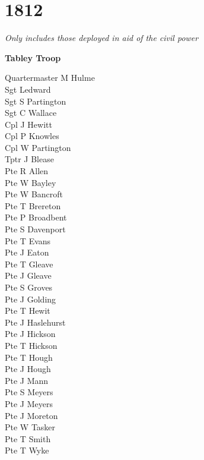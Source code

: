 \chapter*{1812}

\begin{center}
  \textit{Only includes those deployed in aid of the civil power}
\end{center}

\begin{center}
  \Large
  \textbf{Tabley Troop}
\end{center}

\begin{multicols}{2}
  \noindent
  Quartermaster M Hulme \\
  Sgt Ledward \\
  Sgt S Partington \\
  Sgt C Wallace \\
  Cpl J Hewitt \\
  Cpl P Knowles \\
  Cpl W Partington \\
  Tptr J Blease \\
  Pte R Allen \\
  Pte W Bayley \\
  Pte W Bancroft \\
  Pte T Brereton \\
  Pte P Broadbent \\
  Pte S Davenport \\
  Pte T Evans \\
  Pte J Eaton \\
  Pte T Gleave \\
  Pte J Gleave \\
  Pte S Groves \\
  Pte J Golding \\
  Pte T Hewit \\
  Pte J Haslehurst \\
  Pte J Hickson \\
  Pte T Hickson \\
  Pte T Hough \\
  Pte J Hough \\
  Pte J Mann \\
  Pte S Meyers \\
  Pte J Meyers \\
  Pte J Moreton \\
  Pte W Tasker \\
  Pte T Smith \\
  Pte T Wyke \\

\end{multicols}

